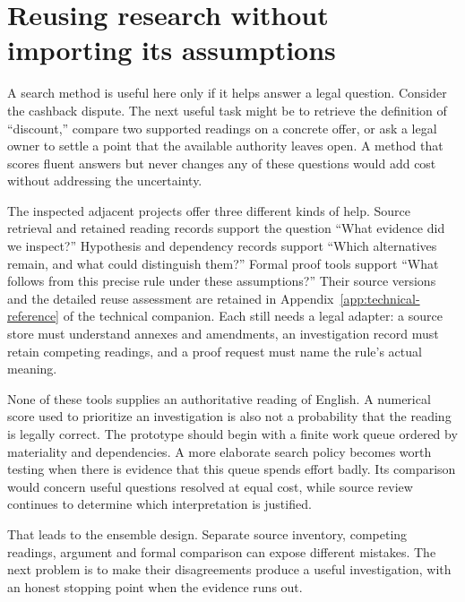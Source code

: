 \section{Reusing research without importing its assumptions}
\label{sec:reader-reuse}

A search method is useful here only if it helps answer a legal question. Consider
the cashback dispute. The next useful task might be to retrieve the definition of
``discount,'' compare two supported readings on a concrete offer, or ask a legal
owner to settle a point that the available authority leaves open. A method that
scores fluent answers but never changes any of these questions would add cost
without addressing the uncertainty.

The inspected adjacent projects offer three different kinds of help. Source
retrieval and retained reading records support the question ``What evidence did
we inspect?'' Hypothesis and dependency records support ``Which alternatives
remain, and what could distinguish them?'' Formal proof tools support ``What
follows from this precise rule under these assumptions?'' Their source versions
and the detailed reuse assessment are retained in
Appendix~\ref{app:technical-reference} of the technical companion. Each still needs a legal adapter: a
source store must understand annexes and amendments, an investigation record must
retain competing readings, and a proof request must name the rule's actual
meaning.

None of these tools supplies an authoritative reading of English. A numerical
score used to prioritize an investigation is also not a probability that the
reading is legally correct. The prototype should begin with a finite work queue
ordered by materiality and dependencies. A more elaborate search policy becomes
worth testing when there is evidence that this queue spends effort badly. Its
comparison would concern useful questions resolved at equal cost, while source
review continues to determine which interpretation is justified.

That leads to the ensemble design. Separate source inventory, competing readings,
argument and formal comparison can expose different mistakes. The next problem
is to make their disagreements produce a useful investigation, with an honest
stopping point when the evidence runs out.
